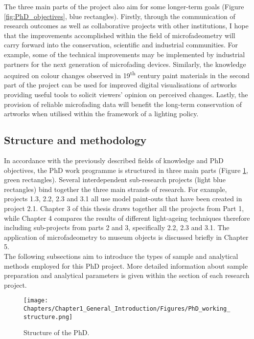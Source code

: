 The three main parts of the project also aim for some longer-term goals (Figure \ref{fig:PhD_objectives}, blue rectangles). Firstly, through the communication of research outcomes as well as collaborative projects with other institutions, I hope that the improvements accomplished within the field of microfadeometry will carry forward into the conservation, scientific and industrial communities. For example, some of the technical improvements may be implemented by industrial partners for the next generation of microfading devices. Similarly, the knowledge acquired on colour changes observed in 19\textsuperscript{th} century paint materials in the second part of the project can be used for improved digital visualisations of artworks providing useful tools to solicit viewers’ opinion on perceived changes. Lastly, the provision of reliable microfading data will benefit the long-term conservation of artworks when utilised within the framework of a lighting policy.


\subsection{Structure and methodology}

In accordance with the previously described fields of knowledge and PhD objectives, the PhD work programme is structured in three main parts (Figure \ref{fig:PhD_work_packages}, green rectangles). Several interdependent sub-research projects (light blue rectangles) bind together the three main strands of research. For example, projects 1.3, 2.2, 2.3 and 3.1 all use model paint-outs that have been created in project 2.1. Chapter 3 of this thesis draws together all the projects from Part 1, while Chapter 4 compares the results of different light-ageing techniques therefore including sub-projects from parts 2 and 3, specifically 2.2, 2.3 and 3.1. The application of microfadeometry to museum objects is discussed briefly in Chapter 5. \\

The following subsections aim to introduce the types of sample and analytical methods employed for this PhD project. More detailed information about sample preparation and analytical parameters is given within the section of each research project.\\

\begin{figure} %
\centering
\texttt{[image: Chapters/Chapter1\_General\_Introduction/Figures/PhD\_working\_structure.png]}
\caption[\hspace{0.3cm}Structure of the PhD thesis]{Structure of the PhD.}
\label{fig:PhD_work_packages}
\end{figure}

